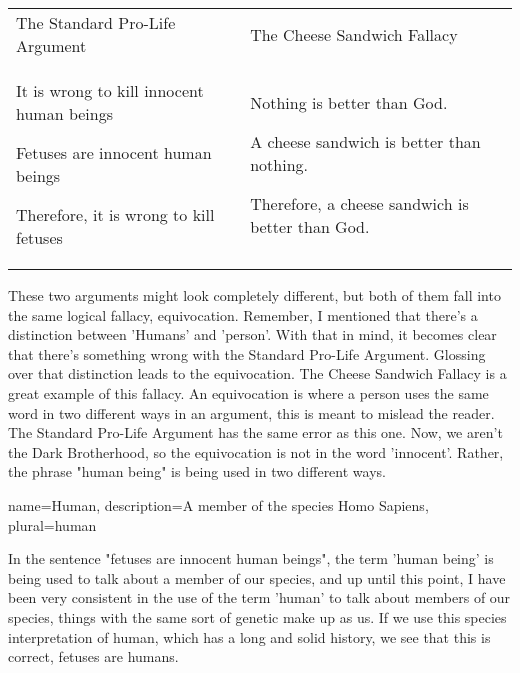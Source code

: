 \begin{tabular}{p{2in}|p{2in}}
The Standard Pro-Life Argument&The Cheese Sandwich Fallacy\\
\begin{earg}
    \item[] It is wrong to kill innocent human beings
    \item[] Fetuses are innocent human beings
    \item[] Therefore, it is wrong to kill fetuses
\end{earg}&
\begin{earg}
    \item[] Nothing is better than God.
    \item[] A cheese sandwich is better than nothing.
    \item[] Therefore, a cheese sandwich is better than God. 
\end{earg}
\end{tabular}
These two arguments might look completely different, but both of them fall into the same logical fallacy, equivocation. Remember, I mentioned that there's a distinction between '\glspl{Human}' and 'person'. With that in mind, it becomes clear that there's something wrong with the Standard Pro-Life Argument. Glossing over that distinction leads to the equivocation. The Cheese Sandwich Fallacy is a great example of this fallacy. An equivocation is where a person uses the same word in two different ways in an argument, this is meant to mislead the reader.  The Standard Pro-Life Argument has the same error as this one. Now, we aren't the Dark Brotherhood, so the equivocation is not in the word 'innocent'. Rather, the phrase "human being" is being used in two different ways.

{
  name=Human,
  description={A member of the species Homo Sapiens},
  plural=human
}


In the sentence "fetuses are innocent human beings", the term 'human being' is being used to talk about a member of our species, and up until this point, I have been very consistent in the use of the term 'human' to talk about members of our species, things with the same sort of genetic make up as us. If we use this species interpretation of human, which has a long and solid history, we see that this is correct, fetuses are humans.

